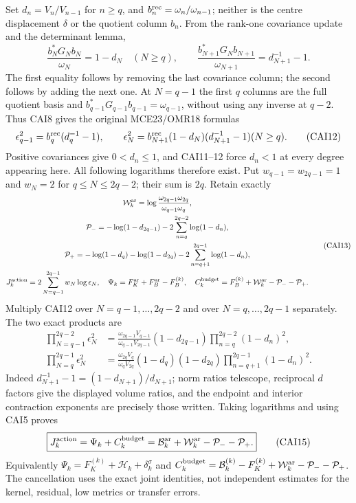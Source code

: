Set $d_n=V_n/V_{n-1}$ for $n\ge q$, and
$b_n^{\rm rec}=\omega_n/\omega_{n-1}$; neither is the centre displacement
$\delta$ or the quotient column $b_n$. From the rank-one covariance
update and the determinant lemma,
\[
 \frac{b_N^*G_Nb_N}{\omega_N}=1-d_N\quad(N\ge q),\qquad
 \frac{b_{N+1}^*G_Nb_{N+1}}{\omega_{N+1}}=d_{N+1}^{-1}-1.
\]
The first equality follows by removing the last covariance column;
the second follows by adding the next one. At $N=q-1$ the first $q$
columns are the full quotient basis and
$b_{q-1}^*G_{q-1}b_{q-1}=\omega_{q-1}$, without using any inverse at
$q-2$. Thus CAI8 gives the original MCE23/OMR18 formulas
\[
 \epsilon_{q-1}^2=b_q^{\rm rec}(d_q^{-1}-1),\qquad
 \epsilon_N^2=b_{N+1}^{\rm rec}(1-d_N)(d_{N+1}^{-1}-1) (N\ge q).
 \tag{CAI12}
\]
Positive covariances give $0<d_n\le1$, and CAI11--12 force $d_n<1$
at every degree appearing here. All following logarithms therefore
exist. Put $w_{q-1}=w_{2q-1}=1$ and $w_N=2$ for $q\le N\le2q-2$;
their sum is $2q$. Retain exactly
\[
\begin{gathered}
 \mathcal W_k^{\rm ar}=\log\frac{\omega_{2q-1}\omega_{2q}}
                                      {\omega_{q-1}\omega_q},\\
 \mathcal P_-=-\log(1-d_{2q-1})-2\sum_{n=q}^{2q-2}\log(1-d_n),\\
 \mathcal P_+=-\log(1-d_q)-\log(1-d_{2q})
                              -2\sum_{n=q+1}^{2q-1}\log(1-d_n),\\
 J_k^{\rm action}=2\sum_{N=q-1}^{2q-1}w_N\log\epsilon_N,\quad
 \Psi_k=F_K^{\rm ar}+F_B^{\rm ar}-F_B^{(k)},\quad
 C_k^{\rm budget}=F_B^{(k)}+\mathcal W_k^{\rm ar}-\mathcal P_--\mathcal P_+.
\end{gathered}\tag{CAI13}
\]
Multiply CAI12 over $N=q-1,\ldots,2q-2$ and over
$N=q,\ldots,2q-1$ separately. The two exact products are
\[
\begin{aligned}
 \prod_{N=q-1}^{2q-2}\epsilon_N^2
 &=\frac{\omega_{2q-1}V_{q-1}}{\omega_{q-1}V_{2q-1}}
            (1-d_{2q-1})\prod_{n=q}^{2q-2}(1-d_n)^2,\\
 \prod_{N=q}^{2q-1}\epsilon_N^2
 &=\frac{\omega_{2q}V_q}{\omega_qV_{2q}}
            (1-d_q)(1-d_{2q})\prod_{n=q+1}^{2q-1}(1-d_n)^2.
\end{aligned}\tag{CAI14}
\]
Indeed $d_{N+1}^{-1}-1=(1-d_{N+1})/d_{N+1}$; norm ratios telescope,
reciprocal $d$ factors give the displayed volume ratios, and the
endpoint and interior contraction exponents are precisely those written.
Taking logarithms and using CAI5 proves
\[
 \boxed{J_k^{\rm action}=\Psi_k+C_k^{\rm budget}
    =\mathcal B_k^{\rm ar}+\mathcal W_k^{\rm ar}-\mathcal P_--\mathcal P_+.}
 \tag{CAI15}
\]
Equivalently $\Psi_k=F_K^{(k)}+\mathcal H_k+\delta_k^\sigma$ and
$C_k^{\rm budget}=\mathcal B_k^{(k)}-F_K^{(k)}+
\mathcal W_k^{\rm ar}-\mathcal P_--\mathcal P_+$.
The cancellation uses the exact joint identities, not independent
estimates for the kernel, residual, low metrics or transfer errors.

